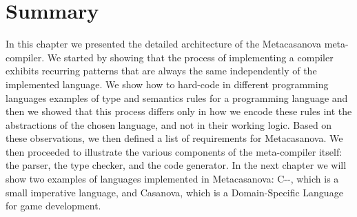 \section{Summary}
In this chapter we presented the detailed architecture of the Metacasanova meta-compiler. We started by showing that the process of implementing a compiler exhibits recurring patterns that are always the same independently of the implemented language. We show how to hard-code in different programming languages examples of type and semantics rules for a programming language and then we showed that this process differs only in how we encode these rules int the abstractions of the chosen language, and not in their working logic. Based on these observations, we then defined a list of requirements for Metacasanova. We then proceeded to illustrate the various components of the meta-compiler itself: the parser, the type checker, and the code generator. In the next chapter we will show two examples of languages implemented in Metacasanova: C-{}-, which is a small imperative language, and Casanova, which is a Domain-Specific Language for game development.


